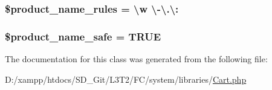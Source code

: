 \subsubsection[{\$product\+\_\+name\+\_\+rules}]{\setlength{\rightskip}{0pt plus 5cm}\$product\+\_\+name\+\_\+rules = \textquotesingle{}\textbackslash{}w \textbackslash{}-\/\textbackslash{}.\textbackslash{}\+:\textquotesingle{}}\label{class_c_i___cart_afdc2e791be5e676e94580a0d9ed63ebf}
\hypertarget{class_c_i___cart_afefced563284b97869b3d35053857362}{}
\subsubsection[{\$product\+\_\+name\+\_\+safe}]{\setlength{\rightskip}{0pt plus 5cm}\$product\+\_\+name\+\_\+safe = T\+R\+U\+E}\label{class_c_i___cart_afefced563284b97869b3d35053857362}


The documentation for this class was generated from the following file\+:\begin{DoxyCompactItemize}
\item 
D\+:/xampp/htdocs/\+S\+D\+\_\+\+Git/\+L3\+T2/\+F\+C/system/libraries/\hyperlink{_cart_8php}{Cart.\+php}\end{DoxyCompactItemize}
